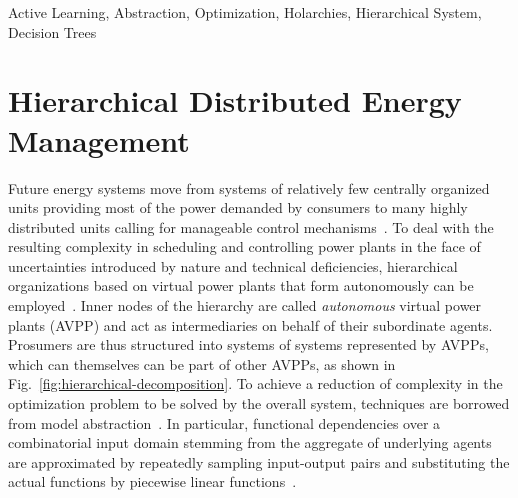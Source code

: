 \documentclass[conference]{IEEEtran}
\newcommand{\noteg}[1]{\sethlcolor{highlightgreen} \hl{\textbf{NOTE:} #1}}
\newcommand{\fref}[1]{Fig.~\ref{#1}}
\begin{document}
\begin{IEEEkeywords}
Active Learning, Abstraction, Optimization, Holarchies, Hierarchical System, Decision Trees
\end{IEEEkeywords}

\section{Hierarchical Distributed Energy Management}
Future energy systems move from systems of relatively few centrally organized units
providing most of the power demanded by consumers to many highly distributed units calling
for manageable control mechanisms~\cite{Ramchurn2012}.
To deal with the resulting complexity in scheduling and controlling power plants in the face of 
uncertainties introduced by nature and technical deficiencies, hierarchical organizations based on virtual power plants
that form autonomously can be employed~\cite{Anders-TAAS-2015,niesse2014conjoint}.
Inner nodes of the hierarchy are called  \emph{autonomous} virtual power plants (AVPP) and act as intermediaries on behalf of their subordinate
agents. Prosumers are thus structured into systems of systems represented by AVPPs, which can themselves can be part of other AVPPs, as 
shown in \fref{fig:hierarchical-decomposition}. To achieve a reduction of complexity in the optimization 
problem to be solved by the overall system, techniques are borrowed from model abstraction~\cite{Frantz_Taxonomy}. 
In particular, functional dependencies over a combinatorial input domain stemming from the
aggregate of underlying agents are approximated by repeatedly sampling input-output pairs
and substituting the actual functions by piecewise linear functions~\cite{Schiendorfer2014}. 
\end{document}
